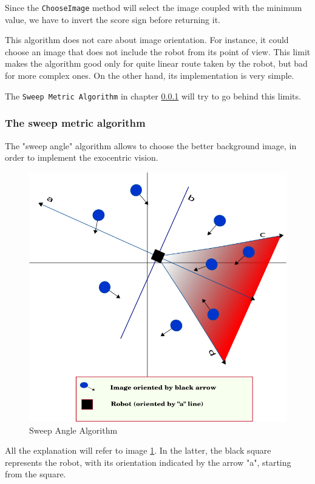 %
Since the \texttt{ChooseImage} method will select the image coupled with the minimum value, we have
to invert the score sign before returning it.
%

%
This algorithm does not care about image orientation. For instance, it could choose an image that
does not include the robot from its point of view. This limit makes the algorithm good only for
quite linear route taken by the robot, but bad for more complex ones. On the other hand, its
implementation is very simple.
%

%
The \texttt{Sweep Metric Algorithm} in chapter \ref{subsec:sweep_metric_algorithm} will try to
go behind this limits.


\subsubsection{The sweep metric algorithm}
\label{subsec:sweep_metric_algorithm}
The "sweep angle" algorithm allows to choose the better background image, in order to implement
the exocentric vision.
%
\begin{figure}[!h]
  \begin{center}
    \includegraphics[width=400pt]{img/half_plan_finding.png} 
    \caption{Sweep Angle Algorithm}
    \label{fig:half_plan_finding}
  \end{center}
\end{figure}
%
All the explanation will refer to image \ref{fig:half_plan_finding}. In the latter, the black
square represents the robot, with its orientation indicated by the arrow "a", starting from the
square.
%


